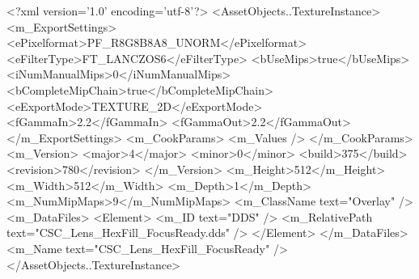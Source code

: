 <?xml version='1.0' encoding='utf-8'?>
<AssetObjects..TextureInstance>
  <m_ExportSettings>
    <ePixelformat>PF_R8G8B8A8_UNORM</ePixelformat>
    <eFilterType>FT_LANCZOS6</eFilterType>
    <bUseMips>true</bUseMips>
    <iNumManualMips>0</iNumManualMips>
    <bCompleteMipChain>true</bCompleteMipChain>
    <eExportMode>TEXTURE_2D</eExportMode>
    <fGammaIn>2.2</fGammaIn>
    <fGammaOut>2.2</fGammaOut>
  </m_ExportSettings>
  <m_CookParams>
    <m_Values />
  </m_CookParams>
  <m_Version>
    <major>4</major>
    <minor>0</minor>
    <build>375</build>
    <revision>780</revision>
  </m_Version>
  <m_Height>512</m_Height>
  <m_Width>512</m_Width>
  <m_Depth>1</m_Depth>
  <m_NumMipMaps>9</m_NumMipMaps>
  <m_ClassName text="Overlay" />
  <m_DataFiles>
    <Element>
      <m_ID text="DDS" />
      <m_RelativePath text="CSC_Lens_HexFill_FocusReady.dds" />
    </Element>
  </m_DataFiles>
  <m_Name text="CSC_Lens_HexFill_FocusReady" />
</AssetObjects..TextureInstance>
